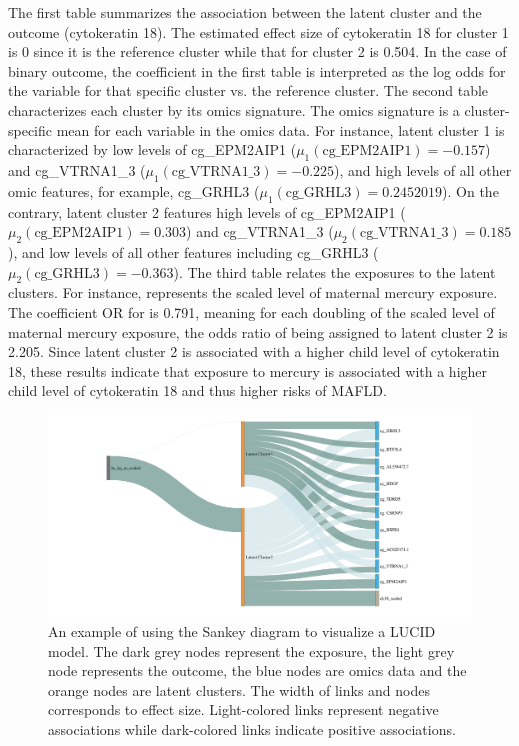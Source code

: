 The first table summarizes the association between the latent cluster and the outcome (cytokeratin 18). The estimated effect size of cytokeratin 18 for cluster 1 is 0 since it is the reference cluster while that for cluster 2 is 0.504. In the case of binary outcome, the coefficient in the first table is interpreted as the log odds for the variable for that specific cluster vs. the reference cluster. The second table characterizes each cluster by its omics signature. The omics signature is a cluster-specific mean for each variable in the omics data. For instance, latent cluster 1 is characterized by low levels of cg{\_}EPM2AIP1 ($\mu_1 (\text{cg{\_}EPM2AIP1})= -0.157$) and cg{\_}VTRNA1{\_}3 ($\mu_1 (\text{cg{\_}VTRNA1{\_}3})= -0.225$), and high levels of all other omic features, for example, cg{\_}GRHL3 ($\mu_1 (\text{cg{\_}GRHL3})= 0.2452019$). On the contrary, latent cluster 2 features high levels of cg{\_}EPM2AIP1 ($\mu_2 (\text{cg{\_}EPM2AIP1})=  0.303$) and cg{\_}VTRNA1{\_}3 ($\mu_2 (\text{cg{\_}VTRNA1{\_}3})= 0.185$), and low levels of all other features including cg{\_}GRHL3 ($\mu_2 (\text{cg{\_}GRHL3})= -0.363$). The third table relates the exposures to the latent clusters. For instance,  represents the scaled level of maternal mercury exposure. The coefficient OR for  is 0.791, meaning for each doubling of the scaled level of maternal mercury exposure, the odds ratio of being assigned to latent cluster 2 is 2.205. Since latent cluster 2 is associated with a higher child level of cytokeratin 18, these results indicate that exposure to mercury is associated with a higher child level of cytokeratin 18 and thus higher risks of MAFLD.

\begin{figure}[]
    \centering
    \includegraphics[width = \textwidth]{figures/fig3.pdf}
    \caption{An example of using the Sankey diagram to visualize a LUCID model. The dark grey nodes represent the exposure, the light grey node represents the outcome, the blue nodes are omics data and the orange nodes are latent clusters. The width of links and nodes corresponds to effect size. Light-colored links represent negative associations while dark-colored links indicate positive associations.}
    \label{fig3}
\end{figure}
